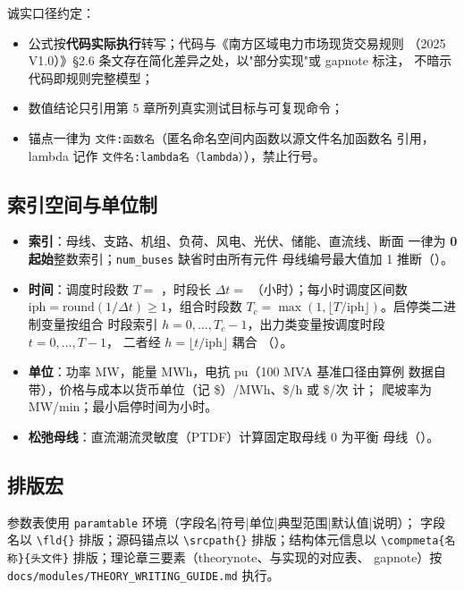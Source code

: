 \documentclass{ctexart}
\begin{document}
诚实口径约定：
\begin{itemize}
  \item 公式按\textbf{代码实际执行}转写；代码与《南方区域电力市场现货交易规则
        （2025 V1.0）》§2.6 条文存在简化差异之处，以"部分实现"或 gapnote 标注，
        不暗示代码即规则完整模型；
  \item 数值结论只引用第 5 章所列真实测试目标与可复现命令；
  \item 锚点一律为 \texttt{文件:函数名}（匿名命名空间内函数以源文件名加函数名
        引用，lambda 记作 \texttt{文件名:lambda名（lambda）}），禁止行号。
\end{itemize}

\subsection{索引空间与单位制}

\begin{itemize}
  \item \textbf{索引}：母线、支路、机组、负荷、风电、光伏、储能、直流线、断面
        一律为 \textbf{0 起始}整数索引；\texttt{num\_buses} 缺省时由所有元件
        母线编号最大值加 1 推断（）。
  \item \textbf{时间}：调度时段数 $T=$ ，时段长
        $\Delta t=$ （小时）；每小时调度区间数
        $\mathrm{iph}=\mathrm{round}(1/\Delta t)\ge 1$，组合时段数
        $T_c=\max(1,\lfloor T/\mathrm{iph}\rfloor)$。启停类二进制变量按组合
        时段索引 $h=0,\dots,T_c-1$，出力类变量按调度时段 $t=0,\dots,T-1$，
        二者经 $h=\lfloor t/\mathrm{iph}\rfloor$ 耦合
        （）。
  \item \textbf{单位}：功率 MW，能量 MWh，电抗 pu（100 MVA 基准口径由算例
        数据自带），价格与成本以货币单位（记 \$）/MWh、\$/h 或 \$/次 计；
        爬坡率为 MW/min；最小启停时间为小时。
  \item \textbf{松弛母线}：直流潮流灵敏度（PTDF）计算固定取母线 0 为平衡
        母线（）。
\end{itemize}

\subsection{排版宏}

参数表使用 \texttt{paramtable} 环境（字段名|符号|单位|典型范围|默认值|说明）；
字段名以 \verb|\fld{}| 排版；源码锚点以 \verb|\srcpath{}| 排版；结构体元信息以
\verb|\compmeta{名称}{头文件}| 排版；理论章三要素（theorynote、与实现的对应表、
gapnote）按 \texttt{docs/modules/THEORY\_WRITING\_GUIDE.md} 执行。
\end{document}
